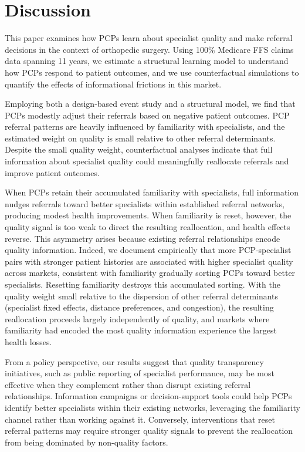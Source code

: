 \documentclass[12pt]{article}
\begin{document}

\section{Discussion}
\label{sec:discuss}

This paper examines how PCPs learn about specialist quality and make referral decisions in the context of orthopedic surgery. Using 100\% Medicare FFS claims data spanning 11 years, we estimate a structural learning model to understand how PCPs respond to patient outcomes, and we use counterfactual simulations to quantify the effects of informational frictions in this market.

Employing both a design-based event study and a structural model, we find that PCPs modestly adjust their referrals based on negative patient outcomes. PCP referral patterns are heavily influenced by familiarity with specialists, and the estimated weight on quality is small relative to other referral determinants. Despite the small quality weight, counterfactual analyses indicate that full information about specialist quality could meaningfully reallocate referrals and improve patient outcomes. 

When PCPs retain their accumulated familiarity with specialists, full information nudges referrals toward better specialists within established referral networks, producing modest health improvements. When familiarity is reset, however, the quality signal is too weak to direct the resulting reallocation, and health effects reverse. This asymmetry arises because existing referral relationships encode quality information. Indeed, we document empirically that more PCP-specialist pairs with stronger patient histories are associated with higher specialist quality across markets, consistent with familiarity gradually sorting PCPs toward better specialists. Resetting familiarity destroys this accumulated sorting. With the quality weight small relative to the dispersion of other referral determinants (specialist fixed effects, distance preferences, and congestion), the resulting reallocation proceeds largely independently of quality, and markets where familiarity had encoded the most quality information experience the largest health losses.

From a policy perspective, our results suggest that quality transparency initiatives, such as public reporting of specialist performance, may be most effective when they complement rather than disrupt existing referral relationships. Information campaigns or decision-support tools could help PCPs identify better specialists within their existing networks, leveraging the familiarity channel rather than working against it. Conversely, interventions that reset referral patterns may require stronger quality signals to prevent the reallocation from being dominated by non-quality factors.
\end{document}
